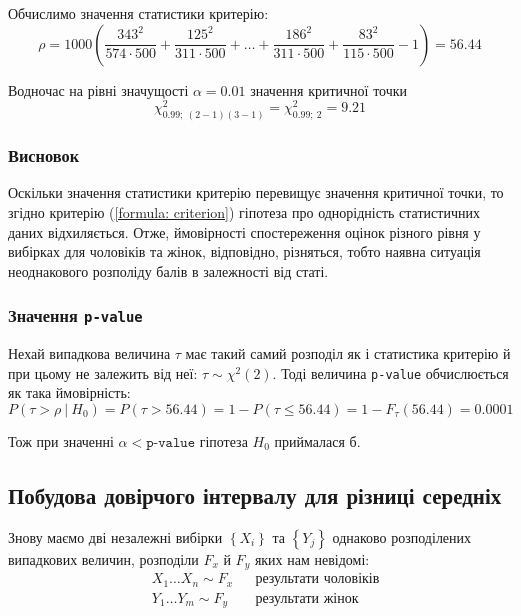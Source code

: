 Обчислимо значення статистики критерію:
\begin{equation*}
    \rho = 1000\left( \frac{343^2}{574\cdot 500}+\frac{125^2}{311\cdot 500} + \ldots + 
    \frac{186^2}{311\cdot 500}+\frac{83^2}{115\cdot 500} - 1 \right) = 56.44
\end{equation*}

Водночас на рівні значущості $\alpha=0.01$ значення критичної точки
\begin{equation*} 
    \chi^2_{0.99;\ (2-1)(3-1)}=\chi^2_{0.99;\ 2}=9.21
\end{equation*}

\subsubsection*{Висновок}

Оскільки значення статистики критерію перевищує значення критичної точки, то згідно критерію 
(\ref{formula: criterion}) гіпотеза про однорідність статистичних даних відхиляється. 
Отже, ймовірності спостереження оцінок різного рівня у вибірках для чоловіків та жінок, 
відповідно, різняться, тобто наявна ситуація неоднакового розполіду балів в залежності від статі.

\subsubsection*{Значення \texttt{p-value}}

Нехай випадкова величина $\tau$ має такий самий розподіл як і статистика критерію й при цьому не залежить 
від неї: $\tau\sim\chi^2(2)$. Тоді величина \texttt{p-value} обчислюється як така ймовірність:
\[ P(\tau>\rho\ |\ H_0)=P(\tau>56.44)=1-P(\tau\leqslant56.44)=1-F_{\tau}(56.44)=0.0001\]

Тож при значенні $\alpha<\texttt{p-value}$ гіпотеза $H_0$ приймалася б.

\subsection*{Побудова довірчого інтервалу для різниці середніх}

Знову маємо дві незалежні вибірки $\left\{ X_i \right\}$ та $\left\{ Y_j \right\}$ 
однаково розподілених випадкових величин, розподіли $F_x$ й $F_y$ яких нам невідомі:
\begin{align*}
    &X_1 \ldots X_n\sim F_x && \text{результати чоловіків} \\
    &Y_1 \ldots Y_m\sim F_y && \text{результати жінок}
\end{align*}

